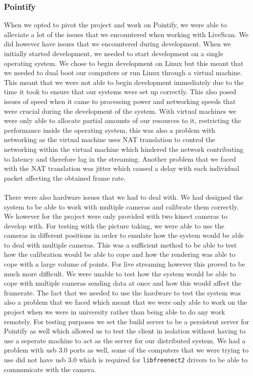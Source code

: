 \documentclass{article}
\begin{document}
\subsubsection{Pointify}
When we opted to pivot the project and work on Pointify, we were able to alleviate a lot of the issues that we encountered when working with LiveScan. We did however have issues that we encountered during development. When we initially started development, we needed to start development on a single operating system. We chose to begin development on Linux but this meant that we needed to dual boot our computers or run Linux through a virtual machine. This meant that we were not able to begin development immediately due to the time it took to ensure that our systems were set up correctly. This also posed issues of speed when it came to processing power and networking speeds that were crucial during the development of the system. With virtual machines we were only able to allocate partial amounts of our resources to it, restricting the performance inside the operating system, this was also a problem with networking as the virtual machine uses NAT translation to control the networking within the virtual machine which hindered the network contributing to latency and therefore lag in the streaming. Another problem that we faced with the NAT translation was jitter which caused a delay with each individual packet affecting the obtained frame rate. 
\\\\
There were also hardware issues that we had to deal with. We had designed the system to be able to work with multiple cameras and calibrate them correctly. We however for the project were only provided with two kinect cameras to develop with. For testing with the picture taking, we were able to use the cameras in different positions in order to emulate how the system would be able to deal with multiple cameras. This was a sufficient method to be able to test how the calibration would be able to cope and how the rendering was able to cope with a large volume of points. For live streaming however this proved to be much more difficult. We were unable to test how the system would be able to cope with multiple cameras sending data at once and how this would affect the framerate. The fact that we needed to use the hardware to test the system was also a problem that we faced which meant that we were only able to work on the project when we were in university rather than being able to do any work remotely. For testing purposes we set the build server to be a persistent server for Pointify as well which allowed us to test the client in isolation without having to use a seperate machine to act as the server for our distributed system. We had a problem with usb 3.0 ports as well, some of the computers that we were trying to use did not have usb 3.0 which is required for \texttt{libfreenect2} drivers to be able to communicate with the camera.
\newpage
\end{document}
